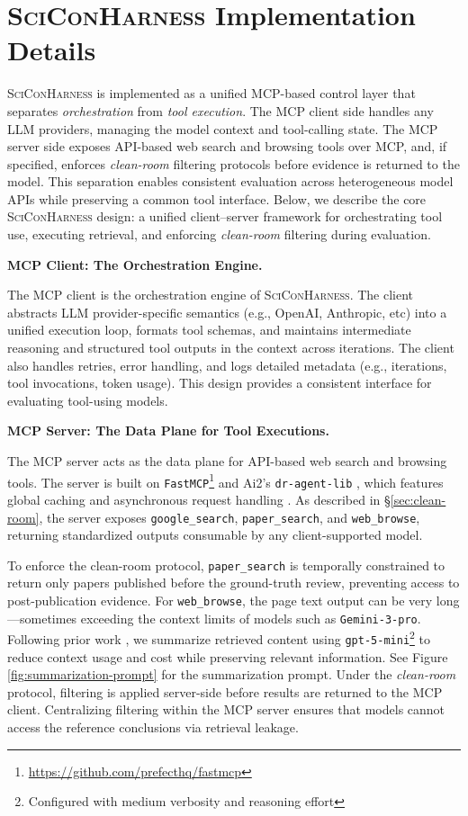 \documentclass{article}
\newcommand{\xhdr}[1]{%
  \noindent\textbf{#1.}
}
\begin{document}
\clearpage

\section{\textsc{SciConHarness} Implementation Details}\label{appendix:sciconharness-implementation}

\textsc{SciConHarness} is implemented as a unified MCP-based control layer that separates \emph{orchestration} from \emph{tool execution}. The MCP client side handles any LLM providers, managing the model context and tool-calling state. The MCP server side exposes API-based web search and browsing tools over MCP, and, if specified, enforces \textit{clean-room} filtering protocols before evidence is returned to the model. This separation enables consistent evaluation across heterogeneous model APIs while preserving a common tool interface. Below, we describe the core \textsc{SciConHarness} design: a unified client--server framework for orchestrating tool use, executing retrieval, and enforcing \textit{clean-room} filtering during evaluation.


\xhdr{MCP Client: The Orchestration Engine}
The MCP client is the orchestration engine of \textsc{SciConHarness}. The client abstracts LLM provider-specific semantics (e.g., OpenAI, Anthropic, etc) into a unified execution loop, formats tool schemas, and maintains intermediate reasoning and structured tool outputs in the context across iterations. The client also handles retries, error handling, and logs detailed metadata (e.g., iterations, tool invocations, token usage). This design provides a consistent interface for evaluating tool-using models.

\xhdr{MCP Server: The Data Plane for Tool Executions}
The MCP server acts as the data plane for API-based web search and browsing tools. The server is built on \texttt{FastMCP}\footnote{\url{https://github.com/prefecthq/fastmcp}} and Ai2's \texttt{dr-agent-lib} \cite{shao2025drtulureinforcementlearning}, which features global caching and asynchronous request handling \cite{jiang2025verltool}. As described in \S\ref{sec:clean-room}, the server exposes \texttt{google\_search}, \texttt{paper\_search}, and \texttt{web\_browse}, returning standardized outputs consumable by any client-supported model.

To enforce the clean-room protocol, \texttt{paper\_search} is temporally constrained to return only papers published before the ground-truth review, preventing access to post-publication evidence. For \texttt{web\_browse}, the page text output can be very long---sometimes exceeding the context limits of models such as \texttt{Gemini-3-pro}. Following prior work \cite{li2025webweaver, shao2025drtulureinforcementlearning}, we summarize retrieved content using \texttt{gpt-5-mini}\footnote{Configured with medium verbosity and reasoning effort} to reduce context usage and cost while preserving relevant information. See Figure \ref{fig:summarization-prompt} for the summarization prompt. Under the \textit{clean-room} protocol, filtering is applied server-side before results are returned to the MCP client. Centralizing filtering within the MCP server ensures that models cannot access the reference conclusions via retrieval leakage.
\end{document}

